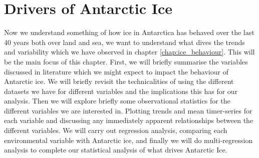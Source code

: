 \documentclass[../main.tex]{subfiles}
\begin{document}
\chapter{Drivers of Antarctic Ice}
\label{chap:environmenal_drivers}






Now we understand something of how ice in Antarctica has behaved over the last 40 years both over land and sea, we want to understand what dives the trends and variability which we have observed in chapter \ref{chap:ice_behaviour}. This will be the main focus of this chapter. First, we will briefly summarise the variables discussed in literature which we might expect to impact the behaviour of Antarctic ice. We will briefly revisit the technicalities of using the different datasets we have for different variables and the implications this has for our analysis. Then we will explore briefly some observational statistics for the different variables we are interested in. Plotting trends and mean timer-series for each variable and discussing any immediately apparent relationships between the different variables. We will carry out regression analysis, comparing each environmental variable with Antarctic ice, and finally we will do multi-regression analysis to complete our statistical analysis of what drives Antarctic Ice.
\end{document}
